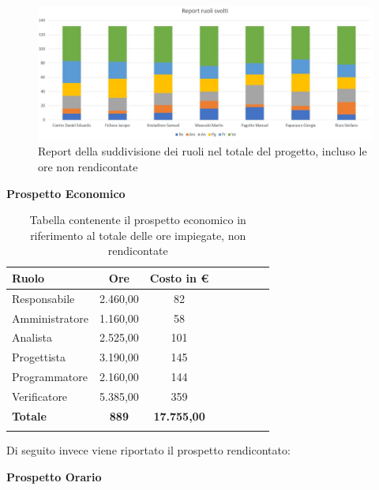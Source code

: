\documentclass[../piano_di_progetto.tex]{subfiles}
\begin{document}
\begin{figure}[H]
\centering
\includegraphics[width=12cm]{img/report_ruoli_tot}
\caption{Report della suddivisione dei ruoli nel totale del progetto, incluso le ore non rendicontate}
\end{figure}

\textbf{Prospetto Economico}

\begin{center}
	\begin{longtable}{|l|c|c|c|c|c|c|c|}
		\hline
		\rowcolor{lightgray}
		\textbf{Ruolo} & \textbf{Ore} & \textbf{Costo in €}\\

		\hline
		Responsabile & 2.460,00 & 82 \\
		\hline
		Amministratore & 1.160,00 & 58 \\
		\hline
		Analista & 2.525,00 & 101 \\
		\hline
		Progettista & 3.190,00 & 145 \\
		\hline
		Programmatore & 2.160,00 & 144 \\
		\hline
		Verificatore & 5.385,00 & 359 \\
		\hline
		\textbf{Totale} & \textbf{889} & \textbf{17.755,00}\\
		\hline
		\caption{Tabella contenente il prospetto economico in riferimento al totale delle ore impiegate, non rendicontate}
	\end{longtable}
\end{center}


Di seguito invece viene riportato il prospetto rendicontato:

\textbf{Prospetto Orario}
\end{document}
